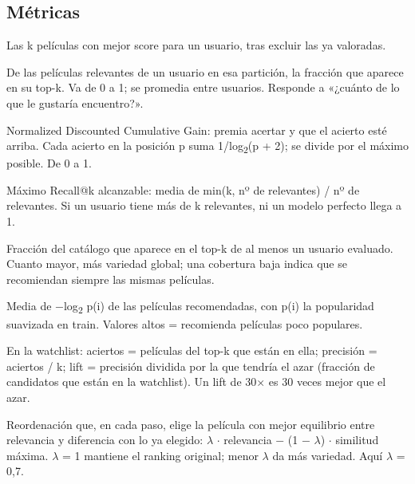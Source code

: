 \subsection*{Métricas}
\begin{description}\setlength{\itemsep}{2pt}
\item[Top-k] Las k películas con mejor score para un usuario, tras excluir las ya valoradas.
\item[Recall@k] De las películas relevantes de un usuario en esa partición, la fracción que aparece en su top-k. Va de 0 a 1; se promedia entre usuarios. Responde a «¿cuánto de lo que le gustaría encuentro?».
\item[NDCG@k] Normalized Discounted Cumulative Gain: premia acertar y que el acierto esté arriba. Cada acierto en la posición p suma 1/\allowbreak{}log\textsubscript{2}(p + 2); se divide por el máximo posible. De 0 a 1.
\item[Techo de recall] Máximo Recall@k alcanzable: media de min(k, nº de relevantes) /\allowbreak{} nº de relevantes. Si un usuario tiene más de k relevantes, ni un modelo perfecto llega a 1.
\item[Cobertura@k] Fracción del catálogo que aparece en el top-k de al menos un usuario evaluado. Cuanto mayor, más variedad global; una cobertura baja indica que se recomiendan siempre las mismas películas.
\item[Novedad@k] Media de $-$log\textsubscript{2} p(i) de las películas recomendadas, con p(i) la popularidad suavizada en train. Valores altos = recomienda películas poco populares.
\item[Aciertos (hits@k), precisión@k, lift] En la watchlist: aciertos = películas del top-k que están en ella; precisión = aciertos /\allowbreak{} k; lift = precisión dividida por la que tendría el azar (fracción de candidatos que están en la watchlist). Un lift de 30$\times$ es 30 veces mejor que el azar.
\item[MMR (relevancia marginal máxima) y $\lambda$] Reordenación que, en cada paso, elige la película con mejor equilibrio entre relevancia y diferencia con lo ya elegido: $\lambda$ $\cdot$ relevancia $-$ (1 $-$ $\lambda$) $\cdot$ similitud máxima. $\lambda$ = 1 mantiene el ranking original; menor $\lambda$ da más variedad. Aquí $\lambda$ = 0,7.
\end{description}

